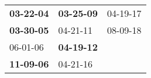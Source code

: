 \begin{supertabular}{p{0.33\columnwidth}p{0.33\columnwidth}p{0.33\columnwidth}}
 \textbf{03-22-04\textsuperscript{}} &  \textbf{03-25-09\textsuperscript{}} &  04-19-17\textsuperscript{} \\
 \textbf{03-30-05\textsuperscript{}} &           04-21-11\textsuperscript{} &  08-09-18\textsuperscript{} \\
          06-01-06\textsuperscript{} &  \textbf{04-19-12\textsuperscript{}} &                             \\
 \textbf{11-09-06\textsuperscript{}} &           04-21-16\textsuperscript{} &                             \\
\end{supertabular}
